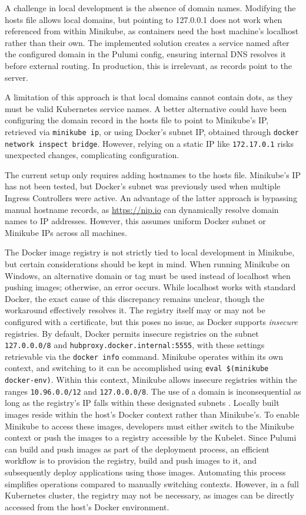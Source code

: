 A challenge in local development is the absence of domain names. Modifying the hosts file allows local domains, but pointing to 127.0.0.1 does not work when referenced from within Minikube, as containers need the host machine's localhost rather than their own. The implemented solution creates a service named after the configured domain in the Pulumi config, ensuring internal DNS resolves it before external routing. In production, this is irrelevant, as records point to the server.

A limitation of this approach is that local domains cannot contain dots, as they must be valid Kubernetes service names. A better alternative could have been configuring the domain record in the hosts file to point to Minikube's IP, retrieved via \texttt{minikube ip}, or using Docker's subnet IP, obtained through \texttt{docker network inspect bridge}. However, relying on a static IP like \texttt{172.17.0.1} risks unexpected changes, complicating configuration.

The current setup only requires adding hostnames to the hosts file. Minikube's IP has not been tested, but Docker's subnet was previously used when multiple Ingress Controllers were active. An advantage of the latter approach is bypassing manual hostname records, as \url{https://nip.io} can dynamically resolve domain names to IP addresses. However, this assumes uniform Docker subnet or Minikube IPs across all machines.

The Docker image registry is not strictly tied to local development in Minikube, but certain considerations should be kept in mind. When running Minikube on Windows, an alternative domain or tag must be used instead of localhost when pushing images; otherwise, an error occurs. While localhost works with standard Docker, the exact cause of this discrepancy remains unclear, though the workaround effectively resolves it. The registry itself may or may not be configured with a certificate, but this poses no issue, as Docker supports \textit{insecure} registries. By default, Docker permits insecure registries on the subnet \texttt{127.0.0.0/8} and \texttt{hubproxy.docker.internal:5555}, with these settings retrievable via the \texttt{docker info} command. Minikube operates within its own context, and switching to it can be accomplished using \texttt{eval \$(minikube docker-env)}. Within this context, Minikube allows insecure registries within the ranges \texttt{10.96.0.0/12} and \texttt{127.0.0.0/8}. The use of a domain is inconsequential as long as the registry's IP falls within these designated subnets \Parencite{dockerInsecureRegistries}. Locally built images reside within the host's Docker context rather than Minikube's. To enable Minikube to access these images, developers must either switch to the Minikube context or push the images to a registry accessible by the Kubelet. Since Pulumi can build and push images as part of the deployment process, an efficient workflow is to provision the registry, build and push images to it, and subsequently deploy applications using those images. Automating this process simplifies operations compared to manually switching contexts. However, in a full Kubernetes cluster, the registry may not be necessary, as images can be directly accessed from the host's Docker environment.

